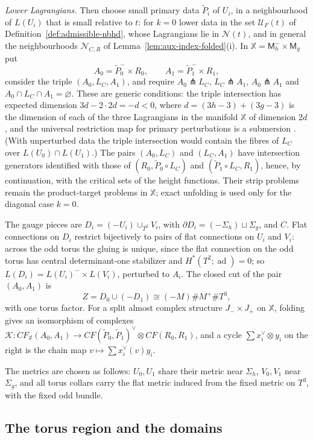 \documentclass[11pt]{amsart}
\theoremstyle{definition}
\theoremstyle{remark}
\theoremstyle{plain}
\numberwithin{equation}{section}
\newcommand{\ad}{\operatorname{ad}}
\newcommand{\CF}{\mathit{CF}}
\newcommand{\Msf}{\mathsf{M}}
\begin{document}
\emph{Lower Lagrangians.} Then choose small primary data $\widetilde P_i$ of $U_i$, in a
neighbourhood of $L(U_i)$ that is small relative to $t$: for $k=0$ lower data in the set
$\mathcal U_F(t)$ of Definition~\ref{def:admissible-nbhd}, whose Lagrangians lie in
$\mathcal N(t)$, and in general the neighbourhoods
$\mathcal N_{C,R}$ of Lemma~\ref{lem:aux-index-folded}(i). In
$\mathbb X=\Msf_h^-\times\Msf_g$ put
\[
A_0=\widetilde P_0^-\times R_0,\qquad A_1=\widetilde P_1^-\times R_1 ,
\]
consider the triple $(A_0,L_C,A_1)$, and require $A_0\pitchfork L_C$, $L_C\pitchfork A_1$, $A_0\pitchfork A_1$ and
$A_0\cap L_C\cap A_1=\varnothing$. These are generic conditions: the triple
intersection has expected dimension $3d-2\cdot2d=-d<0$, where
$d=(3h-3)+(3g-3)$ is the dimension of each of the three Lagrangians in the
manifold $\mathbb X$ of dimension $2d$, and the
universal restriction map for primary perturbations is a submersion
\cite[Section~2.3]{DFL}. (With unperturbed data the triple intersection
would contain the fibres of $L_C$ over $L(U_0)\cap L(U_1)$.) The pairs
$(A_0,L_C)$ and $(L_C,A_1)$ have intersection generators identified
with those of $(R_0,\widetilde P_0\circ L_C)$ and
$(\widetilde P_1\circ L_C,R_1)$, hence, by continuation, with the critical sets of the
height functions. Their strip problems remain the product-target
problems in $\mathbb X$; exact unfolding is used only for the diagonal case
$k=0$.

The gauge pieces are $D_i=(-U_i)\cup_{T^2}V_i$, with $\partial D_i=(-\Sigma_h)
\sqcup\Sigma_g$, and $C$. Flat connections on $D_i$ restrict bijectively to
pairs of flat connections on $U_i$ and $V_i$: across the odd torus the gluing
is unique, since the flat connection on the odd torus has central
determinant-one stabilizer and $H^*(T^2;\ad)=0$; so $L(D_i)=L(U_i)^-\times L(V_i)$,
perturbed to $A_i$. The closed cut of the pair $(A_0,A_1)$ is
\[
Z=D_0\cup(-D_1)\cong(-M)\#M^+\#T^3,
\]
with one torus factor. For a split almost complex structure $J_-\times J_+$ on
$\mathbb X$, folding gives an isomorphism of complexes $\mathcal
K\colon\CF_{\mathbb X}(A_0,A_1)\to\CF(\widetilde P_0,\widetilde P_1)^\vee\otimes\CF(R_0,R_1)$,
and a cycle $\sum x_i^\vee\otimes y_i$ on the right is the chain map
$v\mapsto\sum x_i^\vee(v)y_i$.

The metrics are chosen as follows: $U_0,U_1$ share their metric near
$\Sigma_h$, $V_0,V_1$ near $\Sigma_g$, and all torus collars carry the flat
metric induced from the fixed metric on $T^3$, with the fixed odd bundle.

\subsection{The torus region and the domains}\label{subsec:torus-domains}
\end{document}
